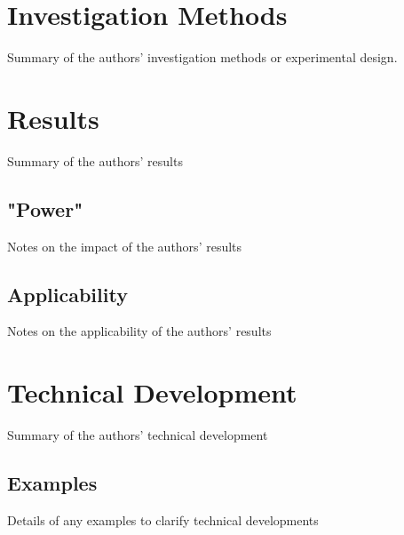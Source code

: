 \documentclass[12pt]{article}
\begin{document}
\section{Investigation Methods}\label{invest}
Summary of the authors' investigation methods or experimental design.

\section{Results}\label{results}
Summary of the authors' results

\subsection{"Power"}\label{results-power}
Notes on the impact of the authors' results

\subsection{Applicability}\label{results-apply}
Notes on the applicability of the authors' results

\section{Technical Development}\label{tech}
Summary of the authors' technical development

\subsection{Examples}\label{tech-examples}
Details of any examples to clarify technical developments



\end{document}
